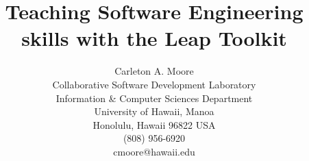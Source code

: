 




\title{Teaching Software Engineering skills with the Leap Toolkit}

\author{
        \hspace*{-2ex}
        \parbox{4.3in} {\begin{center}
        {\authornamefont Carleton A. Moore}\\ 
        Collaborative Software Development Laboratory\\
        Information \& Computer Sciences Department\\
        University of Hawaii, Manoa\\
        Honolulu, Hawaii 96822  USA \\
        (808) 956-6920\\
        cmoore@hawaii.edu
        \end{center} }}
\maketitle
%
%
{}




\thispagestyle{empty}  %

